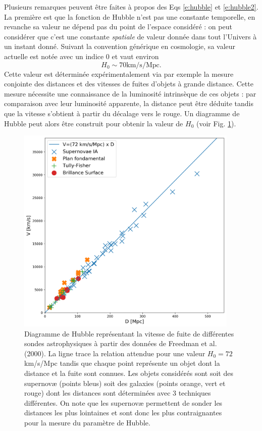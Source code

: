 Plusieurs remarques peuvent être faites à propos des Eqs \ref{e:hubble} et \ref{e:hubble2}.  La première est que la fonction de Hubble n'est pas une constante temporelle, en revanche sa valeur ne dépend pas du point de l'espace considéré : on peut considérer que c'est une constante \textit{spatiale} de valeur donnée dans tout l'Univers à un instant donné. Suivant la convention générique en cosmologie, sa valeur actuelle est notée avec un indice 0 et vaut environ
\begin{equation}
H_0 \sim 70 \mathrm{km/s/Mpc}.
\end{equation}
Cette valeur est déterminée expérimentalement via par exemple la mesure conjointe des distances et des vitesses de fuites d'objets à grande distance. Cette mesure nécessite une connaissance de la luminosité intrinsèque de ces objets  : par comparaison avec leur luminosité apparente, la distance peut être déduite tandis que la vitesse s'obtient à partir du décalage vers le rouge. Un diagramme de Hubble peut alors être construit pour obtenir la valeur de $H_0$ (voir Fig. \ref{f:hubblediag}).
\begin{figure}[htbp]
	\centering
		\includegraphics[height=10cm]{figs/hubble.png}
	\caption[Diagramme de Hubble]{Diagramme de Hubble représentant la vitesse de fuite de différentes sondes astrophysiques à partir des données de Freedman et al. (2000). La ligne trace la relation attendue pour une valeur $H_0=72$ km/s/Mpc tandis que chaque point représente un objet dont la distance et la fuite sont connues. Les objets considérés sont soit des supernovæ (points bleus) soit des galaxies (points orange, vert et rouge) dont les distances sont déterminées avec 3 techniques différentes. On note que les supernovæ permettent de sonder les distances les plus lointaines et sont donc les plus contraignantes pour la mesure du paramètre de Hubble. }
	\label{f:hubblediag}
\end{figure}

